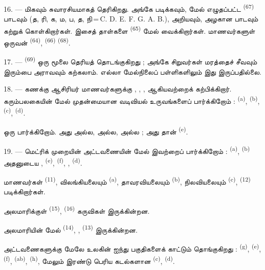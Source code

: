 16. ---  மிகவும் சுவாரசியமாகத் தெரிகிறது. அங்கே
 படிக்கவும்,  மேல் எழுதப்பட்ட
 \textsuperscript{(67)} பாடவும் (த, ரி, க, ம, ப, த,
நி\,=\,C. D. E. F. G. A. B.),  அறியவும், அழகான
 பாடவும் கற்றுக் கொள்கிறார்கள். இசைத் தாள்களை
 \textsuperscript{(65)} மேல் வைக்கிறார்கள்.
மாணவர்களுள் ஒருவன்  \textsuperscript{(64)},
 \textsuperscript{(66)} 
\textsuperscript{(68)}.

17. ---  \textsuperscript{(69)}
 ஒரு மூலை தெரியத் தொடங்குகிறது ; அங்கே சிறுவர்கள் மரத்தைச்
சீவவும் இரும்பை அராவவும் கற்கலாம். எல்லா மேல்நிலைப் பள்ளிகளிலும் இது
இருப்பதில்லை.

\VUsaut{5.0mm}
\VUsaut{3.6mm}

18. --- கணக்கு ஆசிரியர் மாணவர்களுக்கு ,
, ,  ஆகியவற்றைக்
கற்பிக்கிறார். கரும்பலகையின் மேல் முதன்மையான வடிவியல் உருவங்களைப் பார்க்கிறோம் :
 \textsuperscript{(a)},  \textsuperscript{(b)},
 \textsuperscript{(c)},  \textsuperscript{(d)}.

ஒரு  பார்க்கிறோம். அது  அல்ல,
 அல்ல,  அல்ல ; அது
தான் \textsuperscript{(e)}.

19. --- மெட்ரிக் முறையின் அட்டவணையின் மேல் இவற்றைப் பார்க்கிறோம் :
 \textsuperscript{(a)},  \textsuperscript{(b)}
அதனுடைய ,  \textsuperscript{(e)},
 \textsuperscript{(f)}, ,
 \textsuperscript{(d)}.

மாணவர்கள்  \textsuperscript{(11)}, விலங்கியலையும்
\textsuperscript{(a)}, தாவரவியலையும் \textsuperscript{(b)}, நிலவியலையும்
\textsuperscript{(c)},  \textsuperscript{(12)}
படிக்கிறார்கள்.

அலமாரிக்குள்  \textsuperscript{(15)},
 \textsuperscript{(16)} கருவிகள் இருக்கின்றன.

அலமாரியின் மேல்  \textsuperscript{(14)}, ,
 \textsuperscript{(13)} இருக்கின்றன.

அட்டவணைகளுக்கு மேலே உலகின் ஐந்து பகுதிகளைக் காட்டும் 
தொங்குகிறது :  \textsuperscript{(g)}, 
\textsuperscript{(e)},  \textsuperscript{(f)},
 \textsuperscript{(ab)}, 
\textsuperscript{(h)}, மேலும் இரண்டு பெரிய கடல்களான 
\textsuperscript{(c)},  \textsuperscript{(d)}.

\VUsaut{6.0mm}
\VUfilet{22mm}
